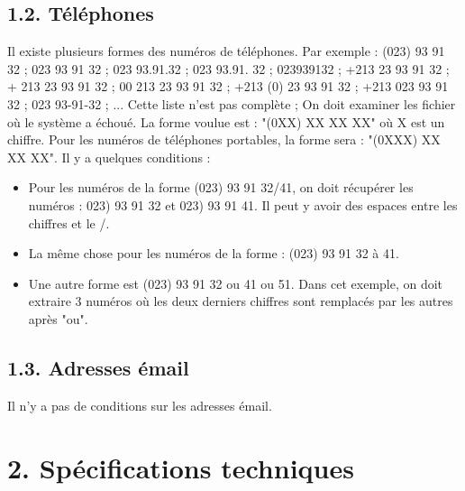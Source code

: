 \documentclass[11pt, a4paper]{article}
\begin{document}
\subsection*{1.2. Téléphones}

Il existe plusieurs formes des numéros de téléphones. 
Par exemple : (023) 93 91 32 ; 023 93 91 32 ; 023 93.91.32 ; 023 93.91. 32 ; 023939132 ;
+213 23 93 91 32 ; + 213 23 93 91 32 ; 00 213 23 93 91 32 ; +213 (0) 23 93 91 32 ; +213 023 93 91 32 ; 023 93-91-32 ; ...
Cette liste n'est pas complète ; On doit examiner les fichier où le système a échoué.
La forme voulue est : "(0XX) XX XX XX" où X est un chiffre. 
Pour les numéros de téléphones portables, la forme sera : "(0XXX) XX XX XX".
Il y a quelques conditions : 
\begin{itemize}
	\item Pour les numéros de la forme (023) 93 91 32/41, on doit récupérer les numéros : 023) 93 91 32 et 023) 93 91 41. 
	Il peut y avoir des espaces entre les chiffres et le /.
	\item La même chose pour les numéros de la forme : (023) 93 91 32 à 41.
	\item Une autre forme est (023) 93 91 32 ou 41 ou 51. Dans cet exemple, on doit extraire 3 numéros où les deux derniers chiffres sont remplacés par les autres après "ou".
\end{itemize}

\subsection*{1.3. Adresses émail}

Il n'y a pas de conditions sur les adresses émail.

\section*{2. Spécifications techniques}
\end{document}
